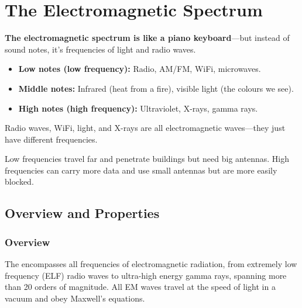 
\chapter{The Electromagnetic Spectrum}
\label{ch:spectrum}

\begin{nontechnical}
    \textbf{The electromagnetic spectrum is like a piano keyboard}---but instead of sound notes, it's frequencies of light and radio waves.

    \begin{itemize}
        \item \textbf{Low notes (low frequency):} Radio, AM/FM, WiFi, microwaves.
        \item \textbf{Middle notes:} Infrared (heat from a fire), visible light (the colours we see).
        \item \textbf{High notes (high frequency):} Ultraviolet, X-rays, gamma rays.
    \end{itemize}

     Radio waves, WiFi, light, and X-rays are all electromagnetic waves---they just have different frequencies.

     Low frequencies travel far and penetrate buildings but need big antennas. High frequencies can carry more data and use small antennas but are more easily blocked.
\end{nontechnical}

\section{Overview and Properties}

\subsection{Overview}

The  encompasses all frequencies of electromagnetic radiation, from extremely low frequency (ELF) radio waves to ultra-high energy gamma rays, spanning more than 20 orders of magnitude. All EM waves travel at the speed of light in a vacuum and obey Maxwell's equations.

